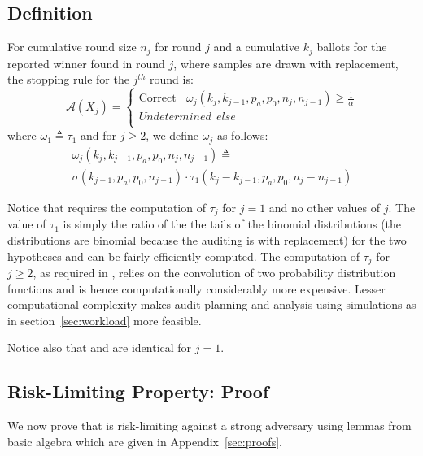 \subsection{Definition}
\label{sec:prov_def}
\begin{definition}
    \label{def:minervatwo}
    For cumulative round size $n_j$ for round $j$ and a cumulative $k_j$ ballots for the reported winner found in round $j$, where samples are drawn with replacement, the \R \Providence stopping rule for the $j^{th}$ round is:
$$
\mathcal{A}(X_{j})=  \left\{ \begin{array}{ll} \text{Correct} ~~~~ \omega_{j}(k_{j}, k_{j-1}, p_a, p_0, n_j, n_{j-1}) \geq \frac{1}{\alpha}\\
        Undetermined ~~else \\
    \end{array}
    \right .
$$
where $\omega _{1}\triangleq \tau_{1}$ and for $j\ge 2$, we define $\omega _{j}$ as follows:
\begin{equation}
    \begin{aligned}
    \omega_{j}(k_{j}, k_{j-1}, p_a, p_0, n_{j}, n_{j-1})
    \triangleq\\
    \sigma(k_{j-1},p_a,p_0,n_{j-1})\cdot \tau_1(k_{j}-k_{j-1},p_a,p_0,n_j-n_{j-1})
    \end{aligned}
\end{equation}
\end{definition}

Notice that \Providence requires the computation of $\tau_j$ for $j=1$ and no other values of $j$. The value of $\tau_1$ is simply the ratio of the the tails of the binomial distributions (the distributions are binomial because the auditing is with replacement) for the two hypotheses and can be fairly efficiently computed. The computation of $\tau_j$ for $j \geq 2$, as required in \Minerva, relies on the convolution of two probability distribution functions and is hence computationally considerably more expensive. Lesser computational complexity makes audit planning and analysis using simulations as in section~\ref{sec:workload} more feasible.

Notice also that \Providence and \Minerva are identical for $j=1$. 

\subsection{Risk-Limiting Property: Proof}
\label{sec:proof}
We now prove that \Providence is risk-limiting against a strong adversary using lemmas from basic algebra which are given in Appendix~\ref{sec:proofs}.

